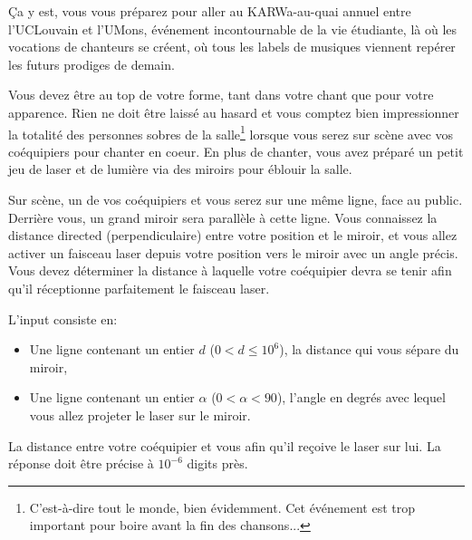 \problemname{\problemyamlname}

Ça y est, vous vous préparez pour aller au KARWa-au-quai annuel entre l'UCLouvain et l'UMons, événement incontournable de la vie étudiante, là où les vocations de chanteurs se créent, où tous les labels de musiques viennent repérer les futurs prodiges de demain.

Vous devez être au top de votre forme, tant dans votre chant que pour votre apparence.
Rien ne doit être laissé au hasard et vous comptez bien impressionner la totalité des personnes sobres de la salle\footnote{C'est-à-dire tout le monde, bien évidemment. Cet événement est trop important pour boire avant la fin des chansons...} lorsque vous serez sur scène avec vos coéquipiers pour chanter en coeur.
En plus de chanter, vous avez préparé un petit jeu de laser et de lumière via des miroirs pour éblouir la salle.

Sur scène, un de vos coéquipiers et vous serez sur une même ligne, face au public.
Derrière vous, un grand miroir sera parallèle à cette ligne.
Vous connaissez la distance directed (perpendiculaire) entre votre position et le miroir, et vous allez activer un faisceau laser depuis votre position vers le miroir avec un angle précis.
Vous devez déterminer la distance à laquelle votre coéquipier devra se tenir afin qu'il réceptionne parfaitement le faisceau laser.

\begin{Input}
	L'input consiste en:
	\begin{itemize}
		\item Une ligne contenant un entier $d$ ($0 < d \le 10^6$), la distance qui vous sépare du miroir,
		\item Une ligne contenant un entier $\alpha$ ($0 < \alpha < 90$), l'angle en degrés avec lequel vous allez projeter le laser sur le miroir.
	\end{itemize}
\end{Input}

\begin{Output}
	La distance entre votre coéquipier et vous afin qu'il reçoive le laser sur lui.
	La réponse doit être précise à $10^{-6}$ digits près.
\end{Output}
